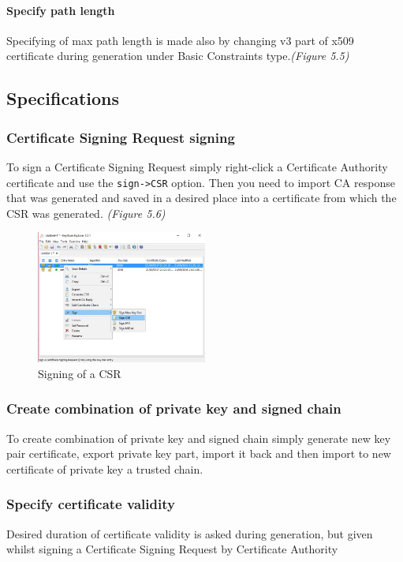 \documentclass[10pt, a4paper]{report}
\begin{document}
      \paragraph{Specify path length}
Specifying of max path length is made also by changing v3 part of x509 certificate during generation under Basic Constraints type.\textit{(Figure 5.5)}

  \subsection{Specifications}
  
    \subsubsection{Certificate Signing Request signing}
To sign a Certificate Signing Request simply right-click a Certificate Authority certificate and use the \verb+sign->CSR+ option. Then you need to import CA response that was generated and saved in a desired place into a certificate from which the CSR was generated. \textit{(Figure 5.6)}

\begin{figure}[!ht]
 \caption{Signing of a CSR}
 \centering
  \includegraphics[width=0.5\textwidth]{../Dependancies/Keystore_Explorer/CSRsign.jpg}
\end{figure}

    \subsubsection{Create combination of private key and signed chain}
To create combination of private key and signed chain simply generate new key pair certificate, export private key part, import it back and then import to new certificate of private key a trusted chain.

    \subsubsection{Specify certificate validity}
Desired duration of certificate validity is asked during generation, but given whilst signing a Certificate Signing Request by Certificate Authority
\end{document}
